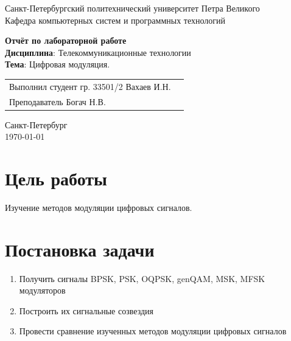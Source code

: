 \documentclass[a4paper,14pt]{extarticle}
\begin{document}
\begin{titlepage}
\centering
Санкт-Петербургский политехнический университет Петра Великого \\
\vspace{0.15cm}
Кафедра компьютерных систем и программных технологий \\
\vspace{6.5cm}

{\centering \textbf{Отчёт по лабораторной работе} \\ 
\vspace{0.15cm}
\textbf{Дисциплина}: Телекоммуникационные технологии \\
\vspace{0.15cm}
\textbf{Тема}: Цифровая модуляция.} \\


\vspace{6.5cm}

\begin{table}[H]
\begin{tabular}{p{\textwidth}@{}r}
{Выполнил студент гр. 33501/2} \hfill {Вахаев И.Н.} \\
{Преподаватель} \hfill {Богач Н.В.} \\
\end{tabular}
\end{table}
\vfill

{\centering Санкт-Петербург \\ 
\vspace{0.15cm}
\today}
\end{titlepage}

\tableofcontents

\newpage

\section{Цель работы}

Изучение методов модуляции цифровых сигналов.

\section{Постановка задачи}

\begin{enumerate}
\item Получить сигналы BPSK, PSK, OQPSK, genQAM, MSK, MFSK модуляторов

\item Построить их сигнальные созвездия

\item Провести сравнение изученных методов модуляции цифровых
сигналов

\end{enumerate}
\end{document}
